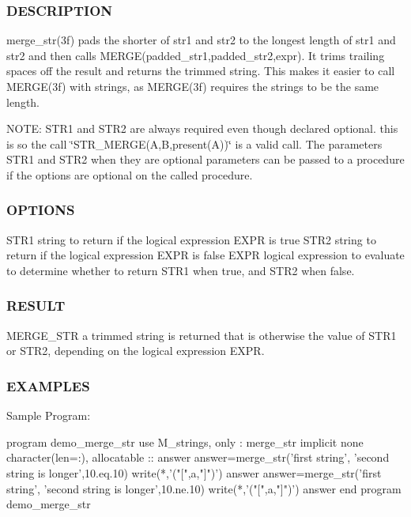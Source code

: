  \subsubsection*{D\+E\+S\+C\+R\+I\+P\+T\+I\+ON}

merge\+\_\+str(3f) pads the shorter of str1 and str2 to the longest length of str1 and str2 and then calls M\+E\+R\+G\+E(padded\+\_\+str1,padded\+\_\+str2,expr). It trims trailing spaces off the result and returns the trimmed string. This makes it easier to call M\+E\+R\+G\+E(3f) with strings, as M\+E\+R\+G\+E(3f) requires the strings to be the same length.

N\+O\+TE\+: S\+T\+R1 and S\+T\+R2 are always required even though declared optional. this is so the call \char`\"{}\+S\+T\+R\+\_\+\+M\+E\+R\+G\+E(\+A,\+B,present(\+A))\char`\"{} is a valid call. The parameters S\+T\+R1 and S\+T\+R2 when they are optional parameters can be passed to a procedure if the options are optional on the called procedure.

\subsubsection*{O\+P\+T\+I\+O\+NS}

S\+T\+R1 string to return if the logical expression E\+X\+PR is true S\+T\+R2 string to return if the logical expression E\+X\+PR is false E\+X\+PR logical expression to evaluate to determine whether to return S\+T\+R1 when true, and S\+T\+R2 when false. \subsubsection*{R\+E\+S\+U\+LT}

M\+E\+R\+G\+E\+\_\+\+S\+TR a trimmed string is returned that is otherwise the value of S\+T\+R1 or S\+T\+R2, depending on the logical expression E\+X\+PR.

\subsubsection*{E\+X\+A\+M\+P\+L\+ES}

Sample Program\+: \begin{DoxyVerb} program demo_merge_str
 use M_strings, only : merge_str
 implicit none
 character(len=:), allocatable :: answer
    answer=merge_str('first string', 'second string is longer',10.eq.10)
    write(*,'("[",a,"]")') answer
    answer=merge_str('first string', 'second string is longer',10.ne.10)
    write(*,'("[",a,"]")') answer
 end program demo_merge_str
\end{DoxyVerb}


